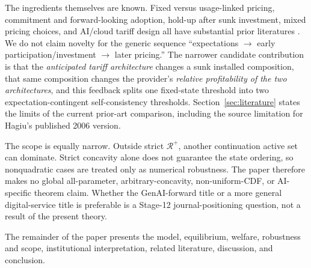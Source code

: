 The ingredients themselves are known. Fixed versus usage-linked pricing, commitment and forward-looking adoption, hold-up after sunk investment, mixed pricing choices, and AI/cloud tariff design all have substantial prior literatures \citep{sundararajan2004,hagiu2006,gans2012,mutherswismer2022,wanghu2014,minryu2025,bergemannbonattismolin2025,bergemannwang2025}. We do not claim novelty for the generic sequence ``expectations $\rightarrow$ early participation/investment $\rightarrow$ later pricing.'' The narrower candidate contribution is that the \emph{anticipated tariff architecture} changes a sunk installed composition, that same composition changes the provider's \emph{relative profitability of the two architectures}, and this feedback splits one fixed-state threshold into two expectation-contingent self-consistency thresholds. Section~\ref{sec:literature} states the limits of the current prior-art comparison, including the source limitation for Hagiu's published 2006 version.

The scope is equally narrow. Outside strict $\mathcal R^+$, another continuation active set can dominate. Strict concavity alone does not guarantee the state ordering, so nonquadratic cases are treated only as numerical robustness. The paper therefore makes no global all-parameter, arbitrary-concavity, non-uniform-CDF, or AI-specific theorem claim. Whether the GenAI-forward title or a more general digital-service title is preferable is a Stage-12 journal-positioning question, not a result of the present theory.

The remainder of the paper presents the model, equilibrium, welfare, robustness and scope, institutional interpretation, related literature, discussion, and conclusion.
